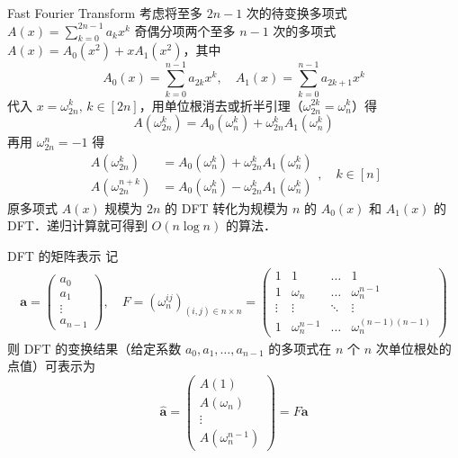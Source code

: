 \documentclass[fontset=fandol]{ctexbeamer}
\renewcommand{\vec}{\boldsymbol}
\begin{document}
\begin{frame}{Fast Fourier Transform}
考虑将至多 $2n-1$ 次的待变换多项式 $A(x) = \sum_{k=0}^{2n-1} a_k x^k$ 奇偶分项两个至多 $n-1$ 次的多项式 $A(x) = A_0 (x^2) + x A_1(x^2)$，其中
\[
A_0 (x) = \sum_{k=0}^{n-1} a_{2k} x^k,\quad
A_1 (x) = \sum_{k=0}^{n-1} a_{2k+1} x^k
\]
代入 $x = \omega_{2n}^k,\, k \in [2n]$，用单位根消去或折半引理（$\omega_{2n}^{2k} = \omega_n^k$）得
\[
A(\omega_{2n}^k) = A_0 (\omega_{n}^k) + \omega_{2n}^k A_1 (\omega_{n}^k)
\]
再用 $\omega_{2n}^{n} = -1$ 得
\[
\begin{aligned}
A(\omega_{2n}^k) &= A_0 (\omega_n^k) + \omega_{2n}^k A_1 (\omega_n^k) \\
A(\omega_{2n}^{n+k}) &= A_0 (\omega_n^k) - \omega_{2n}^k A_1(\omega_n^k) 
\end{aligned}
,\quad k \in [n]
\]
原多项式 $A(x)$ 规模为 $2n$ 的 DFT 转化为规模为 $n$ 的 $A_0(x)$ 和 $A_1(x)$ 的 DFT．递归计算就可得到 $O(n \log n)$ 的算法．
\end{frame}

\begin{frame}{DFT 的矩阵表示}
记
\[
\begin{gathered}
\vec a =  \begin{pmatrix}a_0 \\ a_1 \\ \vdots \\ a_{n-1}\end{pmatrix},\quad
F = \left( \omega_n^{ij} \right)_{(i,j) \in n \times n} = \begin{pmatrix}
1 & 1 & \dots & 1 \\
1 & \omega_n & \dots & \omega_n^{n-1} \\
\vdots & \vdots & \ddots & \vdots \\
1 & \omega_n^{n-1} & \dots & \omega_n^{(n-1)(n-1)}
\end{pmatrix}
\end{gathered}
\]
则 DFT 的变换结果（给定系数 $a_0,a_1,\dots,a_{n-1}$ 的多项式在 $n$ 个 $n$ 次单位根处的点值）可表示为
\[
\hat{\vec a} = \begin{pmatrix}A(1) \\ A(\omega_n) \\ \vdots \\ A(\omega_n^{n-1})\end{pmatrix} = F \vec a
\]
\end{frame}
\end{document}

